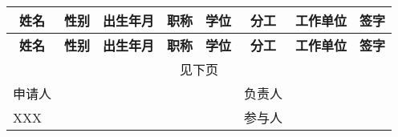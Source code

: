 \begin{center}
	\begin{longtable}{|m{48pt}|c|c|m{36pt}|c|m{36pt}|m{72pt}|c|}
		\hline
		\multicolumn{1}{|c|}{\bf 姓名} & {\bf 性别} & {\bf  出生年月} & \multicolumn{1}{c|}{\bf 职称} & {\bf 学位} & \multicolumn{1}{|c|}{\bf 分工} & \multicolumn{1}{c|}{\bf 工作单位} & {\bf  签字}\\
		\endfirsthead
		
		\hline
			\multicolumn{1}{|c|}{\bf 姓名} & {\bf 性别} & {\bf  出生年月} & {\bf 职称} & \multicolumn{1}{|c|}{\bf 学位} & \multicolumn{1}{|c|}{\bf 分工} & \multicolumn{1}{|c|}{\bf 工作单位} & {\bf  签字}\\
		\endhead
		
		\multicolumn{8}{|c|}{见下页}\\
		\hline
		\endfoot
		
		\hline
		\endlastfoot
	
	
		\hline
		申请人 &   &  &   &   & 负责人 &  	&  \\
		\hline
		XXX &   &  &   &   & 参与人 &   	&  \\
		
	\end{longtable}
\end{center}
